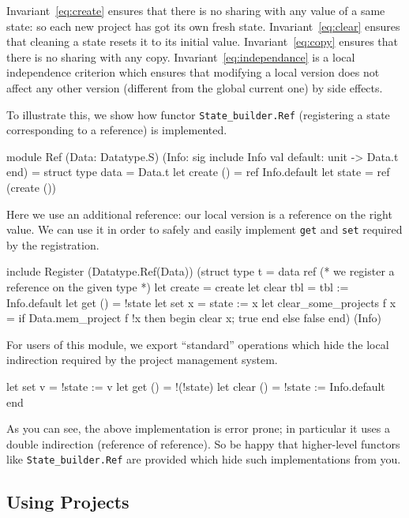 Invariant~\ref{eq:create} ensures that there is no sharing%
 with any value of a same state: so each new project has
got its own fresh state. Invariant~\ref{eq:clear} ensures that cleaning
a state resets it to its initial
value. Invariant~\ref{eq:copy} ensures that there is no sharing with any
copy. Invariant~\ref{eq:independance} is a local independence criterion which
ensures that modifying a local version does not affect any other version
(different from the global current one) by side effects.
\begin{example}
  To illustrate this, we show how functor
  \texttt{State\_builder.Ref} (registering a state
  corresponding to a reference) is implemented.
\begin{ocamlcode}
module Ref
  (Data: Datatype.S)
  (Info: sig include Info val default: unit -> Data.t end) =
struct
  type data = Data.t
  let create () = ref Info.default
  let state = ref (create ())
\end{ocamlcode}
Here we use an additional reference: our local version%
 is a reference on the right value. We can
use it in order to safely and easily implement \texttt{get} and \texttt{set}
required by the registration.
\begin{ocamlcode}
  include Register
    (Datatype.Ref(Data))
    (struct
      type t = data ref (* we register a reference on the given type *)
      let create = create
      let clear tbl = tbl := Info.default
      let get () = !state
      let set x = state := x
      let clear_some_projects f x =
        if Data.mem_project f !x then begin clear x; true end else false
    end)
   (Info)
\end{ocamlcode}
For users of this module, we export ``standard'' operations which hide the
local indirection required by the project management system.
\begin{ocamlcode}
  let set v = !state := v
  let get () = !(!state)
  let clear () = !state := Info.default
end
\end{ocamlcode}
As you can see, the above implementation is error prone; in particular it uses
a double indirection (reference of reference). So be happy that higher-level
functors like \texttt{State\_builder.Ref} are provided which hide such
implementations from you.
\end{example}

\subsection{Using Projects}\label{proj:use}

